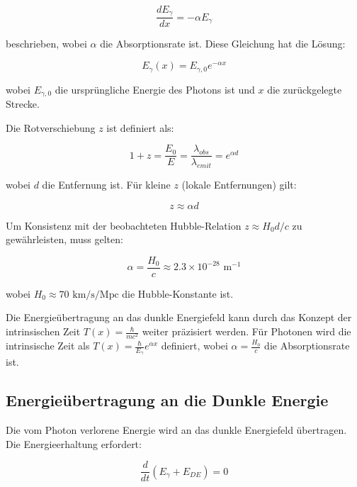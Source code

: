 \documentclass[a4paper,12pt]{article}
\theoremstyle{definition}
\theoremstyle{remark}
\newcommand{\Tfield}{T(x)}
\begin{document}
	\begin{equation}
		\frac{dE_{\gamma}}{dx} = -\alpha E_{\gamma}
	\end{equation}
	
	beschrieben, wobei $\alpha$ die Absorptionsrate ist. Diese Gleichung hat die Lösung:
	
	\begin{equation}
		E_{\gamma}(x) = E_{\gamma,0} e^{-\alpha x}
	\end{equation}
	
	wobei $E_{\gamma,0}$ die ursprüngliche Energie des Photons ist und $x$ die zurückgelegte Strecke.
	
	Die Rotverschiebung $z$ ist definiert als:
	
	\begin{equation}
		1 + z = \frac{E_0}{E} = \frac{\lambda_{obs}}{\lambda_{emit}} = e^{\alpha d}
	\end{equation}
	
	wobei $d$ die Entfernung ist. Für kleine $z$ (lokale Entfernungen) gilt:
	
	\begin{equation}
		z \approx \alpha d
	\end{equation}
	
	Um Konsistenz mit der beobachteten Hubble-Relation $z \approx H_0 d/c$ zu gewährleisten, muss gelten:
	
	\begin{equation}
		\alpha = \frac{H_0}{c} \approx 2.3 \times 10^{-28} \text{ m}^{-1}
	\end{equation}
	
	wobei $H_0 \approx 70 \text{ km/s/Mpc}$ die Hubble-Konstante ist.
	
	Die Energieübertragung an das dunkle Energiefeld kann durch das Konzept der intrinsischen Zeit $\Tfield = \frac{\hbar}{mc^2}$ weiter präzisiert werden. Für Photonen wird die intrinsische Zeit als $\Tfield = \frac{\hbar}{E_{\gamma}} e^{\alpha x}$ definiert, wobei $\alpha = \frac{H_0}{c}$ die Absorptionsrate ist.
	
	\subsection{Energieübertragung an die Dunkle Energie}
	Die vom Photon verlorene Energie wird an das dunkle Energiefeld übertragen. Die Energieerhaltung erfordert:
	
	\begin{equation}
		\frac{d}{dt}(E_{\gamma} + E_{DE}) = 0
	\end{equation}
	
\end{document}
